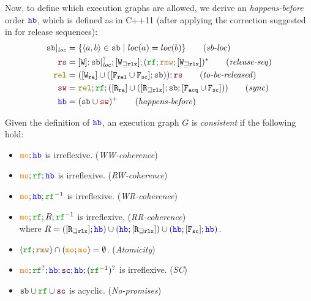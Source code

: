 Now, to define which execution graphs are allowed, 
we derive an \emph{happens-before} order ${\color{blue} \texttt{hb}}$,
which is defined as in C++11
(after applying the correction suggested in \cite{c11comp} for release sequences):
\begin{align*}
\lSB\rst{\LOC} &=  \{\tup{a,b} \in \lSB \suchthat \loc(a)=\loc(b)\} \tag{\emph{sb-loc}}
\\ \lRSEQ &=  [\lW];\lSB\rst{\LOC}^?;[\lW_{\sqsupseteq\rlx}];(\lRF;\lRMW;[\lW_{\sqsupseteq\rlx}])^* \tag{\emph{release-seq}}
\\ \lREL &= ([\lW_\ra] \cup ([\lF_\relo \cup \lF_\sco];\lSB));\lRSEQ \tag{\emph{to-be-released}}
\\ \lSYN &= \lREL;\lRF; ([\lR_\ra] \cup ([\lR_{\sqsupseteq \rlx}];\lSB;[\lF_\acqo\cup \lF_\sco])) \tag{\emph{sync}}
\\ \lHB &= (\lSB \cup \lSYN)^+  \tag{\emph{happens-before}}
\end{align*}

Given the definition of ${\color{blue} \texttt{hb}}$, 
an {execution graph} $G$  is \emph{consistent} if the following hold:
\begin{itemize}
\item ${\color{orange} \texttt{mo}};{\color{blue} \texttt{hb}}$ is irreflexive.  \hfill(\emph{WW-coherence})
\item $\lMO;\lRF;\lHB$ is irreflexive.  \hfill(\emph{RW-coherence})
\item $\lMO;\lHB ; \lRF^{-1}$ is irreflexive.  \hfill(\emph{WR-coherence})
\item $\lMO;\lRF;R;\lRF^{-1}$ is irreflexive,   \hfill(\emph{RR-coherence})
\\ where $R=([{\texttt{R}}_{\sqsupseteq \texttt{rlx}}];{\color{blue} \texttt{hb}}) \cup 
({\color{blue} \texttt{hb}};[{\texttt{R}}_{\sqsupseteq \texttt{rlx}}]) \cup
({\color{blue} \texttt{hb}};[{\texttt{F}}_{\texttt{sc}}];{\color{blue} \texttt{hb}})$.
\item $(\lRF;\lRMW) \cap (\lMO;\lMO) = \emptyset$.  \hfill(\emph{Atomicity})
\item $\lMO;\lRF^?;\lHB;\lSC; \lHB;(\lRF^{-1})^?$  is irreflexive.  \hfill(\emph{SC})
\item $\lSB \cup \lRF \cup \lSC$ is acyclic. \hfill(\emph{No-promises})
\end{itemize}

